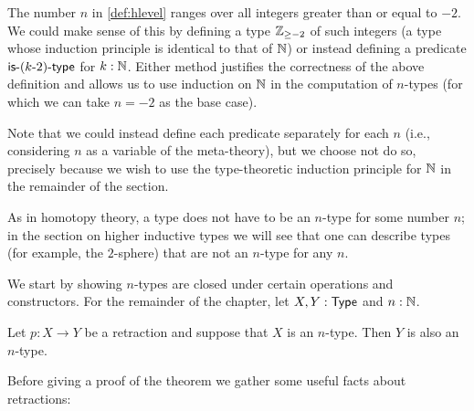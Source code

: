 \begin{rmk}
The number $n$ in \autoref{def:hlevel} ranges over all integers greater than or equal to $-2$. We could make sense of this by defining a type $\mathbb{Z}_{{\geq}-2}$ of such integers (a type whose induction principle is identical to that of $\mathbb{N}$) or instead defining a predicate $\mathsf{is}\mbox{-}{(k\mbox{-}2)}\mbox{-}\mathsf{type}$ for $k : \mathbb{N}$. Either method justifies the correctness of the above definition and allows us to use induction on $\mathbb{N}$ in the computation of $n$-types (for which we can take $n = -2$ as the base case).
 
Note that we could instead define each predicate separately for each $n$ (i.e., considering $n$ as a variable of the meta-theory), but we choose not do so, precisely because we wish to use the type-theoretic induction principle for $\mathbb{N}$ in the remainder of the section.
\end{rmk}

As in homotopy theory, a type does not have to be an $n$-type for some number $n$; in the section on higher inductive types we will see that one can describe types (for example, the $2$-sphere) that are not an $n$-type for any $n$.

We start by showing $n$-types are closed under certain operations and constructors.
For the remainder of the chapter, let $X, Y : \mathsf{Type}$ and $n : \mathbb{N}$.
\begin{thm}\label{thm:h-level-retracts}
 Let $p \colon X \to Y$ be a retraction and suppose that $X$ is an $n$-type. Then $Y$ is also an $n$-type.
\end{thm}

Before giving a proof of the theorem we gather some useful facts about retractions:

